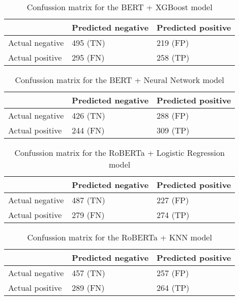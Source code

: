 \begin{table}[H]
\centering
{
\makegapedcells
\begin{tabular}{lll}
                & Predicted negative & Predicted positive \\
\hline
Actual negative & 495 (TN)           & 219 (FP) \\
Actual positive & 295 (FN)           & 258 (TP) \\
\hline
\end{tabular}
}
\caption{Confussion matrix for the BERT + XGBoost model}
\label{bertxgb_cm}
\end{table}

\begin{table}[H]
\centering
{
\makegapedcells
\begin{tabular}{lll}
                & Predicted negative & Predicted positive \\
\hline
Actual negative & 426 (TN)           & 288 (FP) \\
Actual positive & 244 (FN)           & 309 (TP) \\
\hline
\end{tabular}
}
\caption{Confussion matrix for the BERT + Neural Network model}
\label{bertnn_cm}
\end{table}



\begin{table}[H]
\centering
{
\makegapedcells
\begin{tabular}{lll}
                & Predicted negative & Predicted positive \\
\hline
Actual negative & 487 (TN)           & 227 (FP) \\
Actual positive & 279 (FN)           & 274 (TP) \\
\hline
\end{tabular}
}
\caption{Confussion matrix for the RoBERTa + Logistic Regression model}
\label{robertalr_cm}
\end{table}

\begin{table}[H]
\centering
{
\makegapedcells
\begin{tabular}{lll}
                & Predicted negative & Predicted positive \\
\hline
Actual negative & 457 (TN)           & 257 (FP) \\
Actual positive & 289 (FN)           & 264 (TP) \\
\hline
\end{tabular}
}
\caption{Confussion matrix for the RoBERTa + KNN model}
\label{robertaknn_cm}
\end{table}


